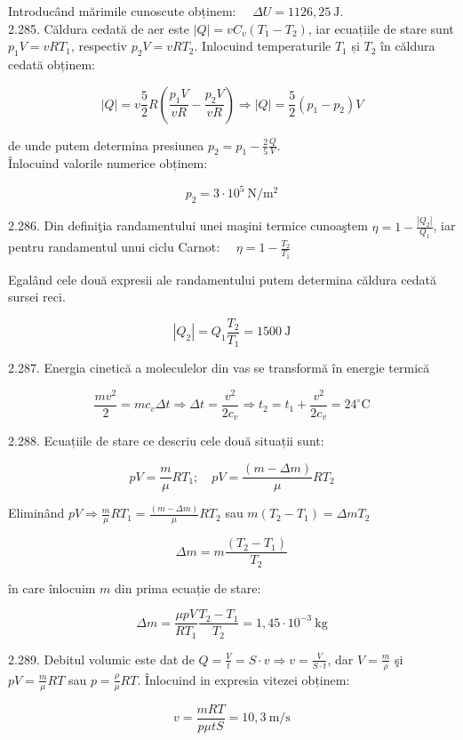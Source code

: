 \documentclass[10pt]{article}
\begin{document}
Introducând mărimile cunoscute obținem: $\quad \Delta U=1126,25 \mathrm{~J}$.\\
2.285. Căldura cedată de aer este $|Q|=v C_{v}\left(T_{1}-T_{2}\right)$, iar ecuațiile de stare sunt $p_{1} V=v R T_{1}$, respectiv $p_{2} V=v R T_{2}$. Inlocuind temperaturile $T_{1}$ și $T_{2}$ în căldura cedată obținem:

$$
|Q|=v \frac{5}{2} R\left(\frac{p_{1} V}{v R}-\frac{p_{2} V}{v R}\right) \Rightarrow|Q|=\frac{5}{2}\left(p_{1}-p_{2}\right) V
$$

de unde putem determina presiunea $p_{2}=p_{1}-\frac{2}{5} \frac{Q}{V}$.\\
Înlocuind valorile numerice obținem:

$$
p_{2}=3 \cdot 10^{5} \mathrm{~N} / \mathrm{m}^{2}
$$

2.286. Din definiţia randamentului unei maşini termice cunoaştem $\eta=1-\frac{\left|Q_{2}\right|}{Q_{1}}$, iar pentru randamentul unui ciclu Carnot: $\quad \eta=1-\frac{T_{2}}{T_{1}}$

Egalând cele două expresii ale randamentului putem determina căldura cedată sursei reci.

$$
\left|Q_{2}\right|=Q_{1} \frac{T_{2}}{T_{1}}=1500 \mathrm{~J}
$$

2.287. Energia cinetică a moleculelor din vas se transformă în energie termică

$$
\frac{m v^{2}}{2}=m c_{v} \Delta t \Rightarrow \Delta t=\frac{v^{2}}{2 c_{v}} \Rightarrow t_{2}=t_{1}+\frac{v^{2}}{2 c_{v}}=24^{\circ} \mathrm{C}
$$

2.288. Ecuațiile de stare ce descriu cele două situații sunt:

$$
p V=\frac{m}{\mu} R T_{1} ; \quad p V=\frac{(m-\Delta m)}{\mu} R T_{2}
$$

Eliminând $p V \Rightarrow \frac{m}{\mu} R T_{1}=\frac{(m-\Delta m)}{\mu} R T_{2}$ sau $m\left(T_{2}-T_{1}\right)=\Delta m T_{2}$

$$
\Delta m=m \frac{\left(T_{2}-T_{1}\right)}{T_{2}}
$$

în care înlocuim $m$ din prima ecuație de stare:

$$
\Delta m=\frac{\mu p V}{R T_{1}} \frac{T_{2}-T_{1}}{T_{2}}=1,45 \cdot 10^{-3} \mathrm{~kg}
$$

2.289. Debitul volumic este dat de $Q=\frac{V}{t}=S \cdot v \Rightarrow v=\frac{V}{S \cdot t}$, dar $V=\frac{m}{\rho}$ şi $p V=\frac{m}{\mu} R T$ sau $p=\frac{\rho}{\mu} R T$. Înlocuind in expresia vitezei obținem:

$$
v=\frac{m R T}{p \mu t S}=10,3 \mathrm{~m} / \mathrm{s}
$$
\end{document}
